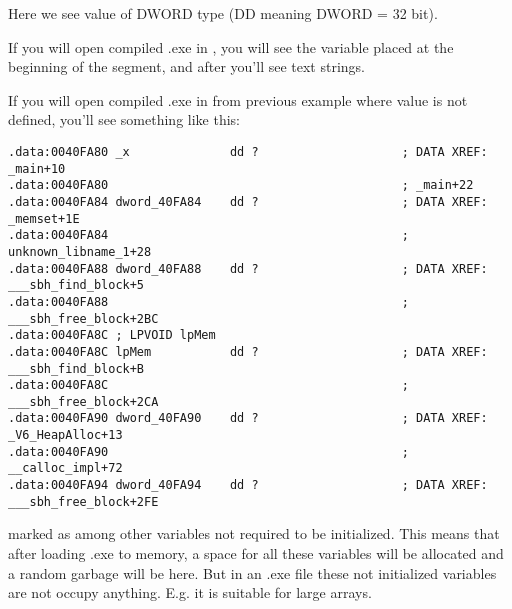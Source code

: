 {Here we see value  of DWORD type (DD meaning DWORD = 32 bit).}

{If you will open compiled .exe in \IDA, you will see the  variable placed at the beginning of 
the  segment, and after you'll see text strings.}

{If you will open compiled .exe in \IDA from previous example where  value is not defined, 
you'll see something like this:}

\begin{lstlisting}
.data:0040FA80 _x              dd ?                    ; DATA XREF: _main+10
.data:0040FA80                                         ; _main+22
.data:0040FA84 dword_40FA84    dd ?                    ; DATA XREF: _memset+1E
.data:0040FA84                                         ; unknown_libname_1+28
.data:0040FA88 dword_40FA88    dd ?                    ; DATA XREF: ___sbh_find_block+5
.data:0040FA88                                         ; ___sbh_free_block+2BC
.data:0040FA8C ; LPVOID lpMem
.data:0040FA8C lpMem           dd ?                    ; DATA XREF: ___sbh_find_block+B
.data:0040FA8C                                         ; ___sbh_free_block+2CA
.data:0040FA90 dword_40FA90    dd ?                    ; DATA XREF: _V6_HeapAlloc+13
.data:0040FA90                                         ; __calloc_impl+72
.data:0040FA94 dword_40FA94    dd ?                    ; DATA XREF: ___sbh_free_block+2FE
\end{lstlisting}

{ marked as  among other variables not required to be initialized. 
This means that after loading .exe to memory, a space for all these variables will be 
allocated and a random garbage will be here. 
But in an .exe file these not initialized variables are not occupy anything. 
E.g. it is suitable for large arrays.}

